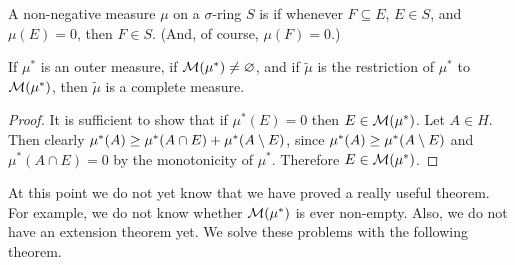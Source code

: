 \begin{definition}
A non-negative measure $\mu$ on a $\sigma$-ring ${S}$ is  if whenever $F \subseteq E$, $E \in S$, and $\mu(E)=0$, then $F\in S$. (And, of course, $\mu(F)=0$.)
\end{definition}

\begin{proposition}
If $\mu^*$ is an outer measure, if ${\cal M}(\mu^*) \neq \varnothing$, and if $\widetilde{\mu}$ is the restriction of $\mu^*$ to ${\cal M}(\mu^*)$, then $\widetilde{\mu}$ is a complete measure.
\end{proposition}

\begin{proof}
It is sufficient to show that if $\mu^*(E)=0$ then $E \in {\cal M}(\mu^*)$. Let $A \in H$. Then clearly $\mu^*(A) \geq \mu^*(A \cap E)+\mu^*(A\setminus E)$, since $\mu^*(A) \geq \mu^*(A\setminus E)$ and $\mu^*(A \cap E)=0$ by the monotonicity of $\mu^*$. Therefore $E \in {\cal M}(\mu^*)$.
\end{proof}

At this point we do not yet know that we have proved a really useful theorem. For example, we do not know whether ${\cal M}(\mu^*)$ is ever non-empty. Also, we do not have an extension theorem yet. We solve these problems with the following theorem.

